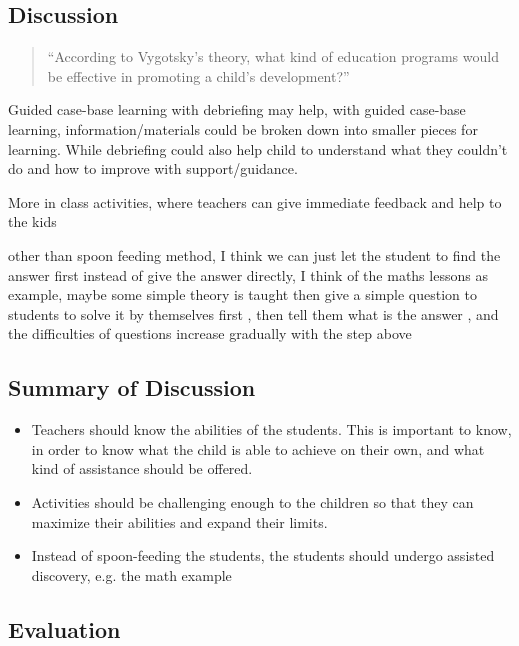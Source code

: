 \documentclass[../main/main.tex]{subfiles}
\begin{document}
\subsection{Discussion}
\begin{quote}
``According to Vygotsky's theory, what kind of education programs would be effective in promoting a child's development?''
\end{quote}
\begin{example}
Guided case-base learning with debriefing may help, with guided case-base learning, information/materials could be broken down into smaller pieces for learning. While debriefing could also help child to understand what they couldn’t do and how to improve with support/guidance.
\end{example}
\begin{example}
More in class activities, where teachers can give immediate feedback and help to the kids
\end{example}
\begin{example}
  other than spoon feeding method, I think we can just let the student to find the answer first instead of give the answer directly, I think of the maths lessons as example, maybe some simple theory is taught then give a simple question to students to solve it by themselves first , then tell them what is the answer , and the difficulties of questions increase gradually with the step above
\end{example}
\subsection{Summary of Discussion}
\begin{itemize}
\item
Teachers should know the abilities of the students. This is important to know, in order to know what the child is able to achieve on their own, and what kind of assistance should be offered.
        \item
Activities should be challenging enough to the children so that they can maximize their abilities and expand their limits.
  \item Instead of spoon-feeding the students, the students should undergo assisted discovery, e.g. the math example
\end{itemize}
\subsection{Evaluation}
\end{document}
